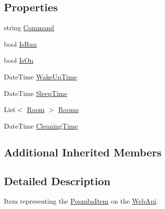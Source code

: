 \subsection*{Properties}
\begin{DoxyCompactItemize}
\item 
string \mbox{\hyperlink{class_master_application_1_1_models_1_1_poomba_item_a370edbb6c5c10653ae52bd0862dab4d7}{Command}}
\item 
bool \mbox{\hyperlink{class_master_application_1_1_models_1_1_poomba_item_a10d6e57b561c0fb14da6cf229c213b1b}{Is\+Run}}
\item 
bool \mbox{\hyperlink{class_master_application_1_1_models_1_1_poomba_item_a342e6657f2d674b0eb9179e23aa10d52}{Is\+On}}
\item 
Date\+Time \mbox{\hyperlink{class_master_application_1_1_models_1_1_poomba_item_a88b6e2d533473fea1a58689f22591c5e}{Wake\+Up\+Time}}
\item 
Date\+Time \mbox{\hyperlink{class_master_application_1_1_models_1_1_poomba_item_a007110e370be4b07adb166ec630e63bb}{Sleep\+Time}}
\item 
List$<$ \mbox{\hyperlink{class_master_application_1_1_models_1_1_room}{Room}} $>$ \mbox{\hyperlink{class_master_application_1_1_models_1_1_poomba_item_a98df3ea994f2eebb09316e8af70269be}{Rooms}}
\item 
Date\+Time \mbox{\hyperlink{class_master_application_1_1_models_1_1_poomba_item_a814654e690de3c3c50dc1902c7602618}{Cleaning\+Time}}
\end{DoxyCompactItemize}
\subsection*{Additional Inherited Members}


\subsection{Detailed Description}
Item representing the \mbox{\hyperlink{class_master_application_1_1_models_1_1_poomba_item}{Poomba\+Item}} on the \mbox{\hyperlink{namespace_web_api}{Web\+Api}}. 

